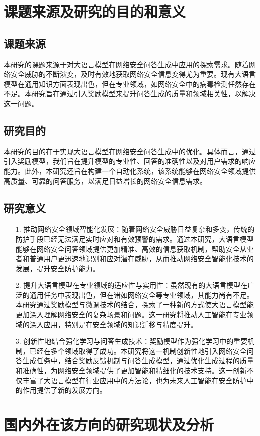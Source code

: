 \section{课题来源及研究的目的和意义}
\subsection{课题来源}
本研究的课题来源于对大语言模型在网络安全问答生成中应用的探索需求。随着网络安全威胁的不断演变，及时有效地获取网络安全信息变得尤为重要。现有大语言模型在通用知识方面表现出色，但在专业领域，如网络安全中的病毒检测任然存在不足。本研究旨在通过引入奖励模型来提升问答生成的质量和领域相关性，以解决这一问题。
\subsection{研究目的}
本研究的目的在于实现大语言模型在网络安全问答生成中的优化。具体而言，通过引入奖励模型，我们旨在提升模型的专业性、回答的准确性以及对用户需求的响应能力。此外，本研究还旨在构建一个自动化系统，该系统能够在网络安全领域提供高质量、可靠的问答服务，以满足日益增长的网络安全信息需求。
\subsection{研究意义}
\begin{itemize}
    \item[1.] 推动网络安全领域智能化发展：随着网络安全威胁日益复杂和多变，传统的防护手段已经无法满足实时应对和有效预警的需求。通过本研究，大语言模型能够在网络安全问答领域提供更加精准、高效的信息获取机制，帮助安全从业者和普通用户更迅速地识别和应对潜在威胁，从而推动网络安全智能化技术的发展，提升安全防护能力。
    \item[2.] 提升大语言模型在专业领域的适应性与实用性：虽然现有的大语言模型在广泛的通用任务中表现出色，但在诸如网络安全等专业领域，其能力尚有不足。本研究通过奖励模型与微调技术的结合，探索了一种新的方式使大语言模型能更加深入理解网络安全的复杂场景和问题。这一研究将推动人工智能在专业领域的深入应用，特别是在安全领域的知识迁移与精度提升。
    \item[3.] 创新性地结合强化学习与问答生成技术：奖励模型作为强化学习中的重要机制，已经在多个领域取得了成功。本研究将这一机制创新性地引入网络安全问答生成任务中，结合奖励反馈机制与问答生成模型，通过优化生成过程的质量和准确性，为网络安全领域提供了更加智能和精细化的技术支持。这一创新不仅丰富了大语言模型在行业应用中的方法论，也为未来人工智能在安全防护中的作用提供了新的发展方向。
\end{itemize}
\section{国内外在该方向的研究现状及分析}
